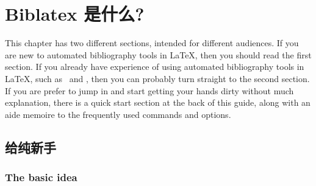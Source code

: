 


\chapter{Biblatex 是什么?}
\label{ch:introduction}

This chapter has two different sections, intended for different
audiences. If you are new to automated bibliography tools in \LaTeX,
then you should read the first section. If
you already have experience of using automated bibliography tools in
\LaTeX, such as \bibtex\ and , then you can probably
turn straight to the second section. If you
are prefer to jump in and start getting your hands dirty without much
explanation, there is a quick start section at the back of this
guide, along with an aide memoire to
the frequently used commands and
options.

\section{给纯新手}

\subsection{The basic idea}
\label{newbie}

